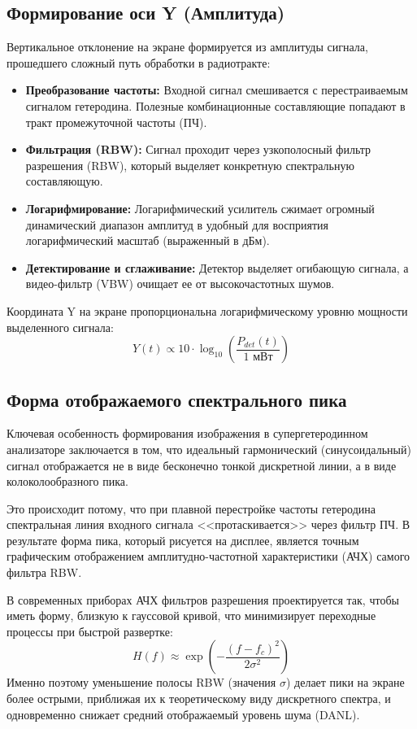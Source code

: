 \subsection*{Формирование оси Y (Амплитуда)}
Вертикальное отклонение на экране формируется из амплитуды сигнала, прошедшего сложный путь обработки в радиотракте:
\begin{itemize}
    \item \textbf{Преобразование частоты:} Входной сигнал смешивается с перестраиваемым сигналом гетеродина. Полезные комбинационные составляющие попадают в тракт промежуточной частоты (ПЧ).
    \item \textbf{Фильтрация (RBW):} Сигнал проходит через узкополосный фильтр разрешения (RBW), который выделяет конкретную спектральную составляющую.
    \item \textbf{Логарифмирование:} Логарифмический усилитель сжимает огромный динамический диапазон амплитуд в удобный для восприятия логарифмический масштаб (выраженный в дБм).
    \item \textbf{Детектирование и сглаживание:} Детектор выделяет огибающую сигнала, а видео-фильтр (VBW) очищает ее от высокочастотных шумов.
\end{itemize}
Координата Y на экране пропорциональна логарифмическому уровню мощности выделенного сигнала:
\begin{equation}
    Y(t) \propto 10 \cdot \log_{10} \left( \frac{P_{det}(t)}{1 \text{ мВт}} \right)
\end{equation}

\subsection*{Форма отображаемого спектрального пика}
Ключевая особенность формирования изображения в супергетеродинном анализаторе заключается в том, что идеальный гармонический (синусоидальный) сигнал отображается не в виде бесконечно тонкой дискретной линии, а в виде колоколообразного пика. 

Это происходит потому, что при плавной перестройке частоты гетеродина спектральная линия входного сигнала <<протаскивается>> через фильтр ПЧ. В результате форма пика, который рисуется на дисплее, является точным графическим отображением амплитудно-частотной характеристики (АЧХ) самого фильтра RBW. 

В современных приборах АЧХ фильтров разрешения проектируется так, чтобы иметь форму, близкую к гауссовой кривой, что минимизирует переходные процессы при быстрой развертке:
\begin{equation}
    H(f) \approx \exp\left( - \frac{(f - f_c)^2}{2\sigma^2} \right)
\end{equation}
Именно поэтому уменьшение полосы RBW (значения $\sigma$) делает пики на экране более острыми, приближая их к теоретическому виду дискретного спектра, и одновременно снижает средний отображаемый уровень шума (DANL).
